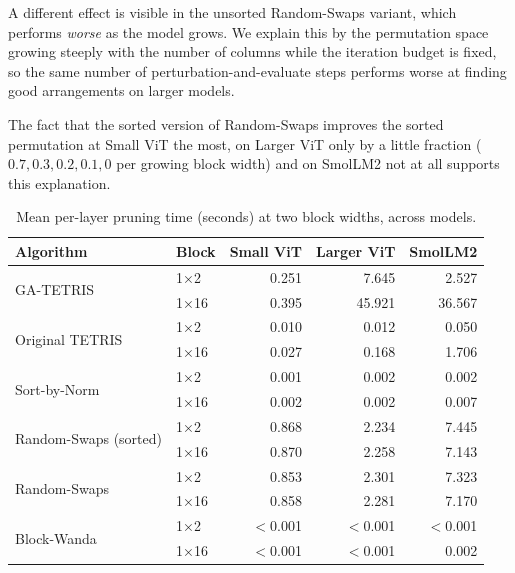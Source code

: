 A different effect is visible in the unsorted Random-Swaps variant, which performs \emph{worse} as the model grows. We explain this by the permutation space growing steeply with the number of columns while the iteration budget is fixed, so the same number of perturbation-and-evaluate steps performs worse at finding good arrangements on larger models.

The fact that the sorted version of Random-Swaps improves the sorted permutation at Small ViT the most, on Larger ViT only by a little fraction ($0.7, 0.3, 0.2, 0.1, 0$ per growing block width) and on SmolLM2 not at all supports this explanation.

\begin{table}[htbp]
    \centering
    \caption{Mean per-layer pruning time (seconds) at two block widths, across models.}
    \label{tab:time_cross_model}
    \begin{tabular}{l l rrr}
        \toprule
        Algorithm & Block & Small ViT & Larger ViT & SmolLM2 \\
        \midrule
        \multirow{2}{*}{GA-TETRIS}             & 1×2  & 0.251     &  7.645    &  2.527    \\
                                               & 1×16 & 0.395     & 45.921    & 36.567    \\
        \midrule
        \multirow{2}{*}{Original TETRIS}       & 1×2  & 0.010     &  0.012    &  0.050    \\
                                               & 1×16 & 0.027     &  0.168    &  1.706    \\
        \midrule
        \multirow{2}{*}{Sort-by-Norm}          & 1×2  & 0.001     &  0.002    &  0.002    \\
                                               & 1×16 & 0.002     &  0.002    &  0.007    \\
        \midrule
        \multirow{2}{*}{Random-Swaps (sorted)} & 1×2  & 0.868     &  2.234    &  7.445    \\
                                               & 1×16 & 0.870     &  2.258    &  7.143    \\
        \midrule
        \multirow{2}{*}{Random-Swaps}          & 1×2  & 0.853     &  2.301    &  7.323    \\
                                               & 1×16 & 0.858     &  2.281    &  7.170    \\
        \midrule
        \multirow{2}{*}{Block-Wanda}           & 1×2  & $<$0.001  & $<$0.001  & $<$0.001  \\
                                               & 1×16 & $<$0.001  & $<$0.001  &  0.002    \\
        \bottomrule
    \end{tabular}
\end{table}

